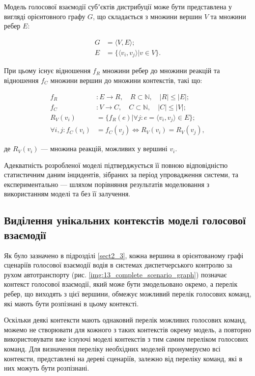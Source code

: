 Модель голосової взаємодії субʼєктів дистрибуції може бути представлена у вигляді орієнтовного графу $G$, що складається з множини вершин $V$ та множини ребер $E$:

\begin{align}
	G&=\langle V,E\rangle; \nonumber\\
	E&=\{\langle v_i,v_j\rangle | v \in V\}. \nonumber
\end{align}

При цьому існує відношення $f_R$ множини ребер до множини реакцій та відношення $f_C$ множини вершин до множини контекстів, такі що:

\begin{align}
	f_R&: E \rightarrow R,\quad R\subset\mathbb{N},\quad |R|\le|E|; \nonumber\\
	f_C&: V \rightarrow C,\quad C\subset\mathbb{N},\quad|C|\le|V|; \nonumber\\
	R_V(v_i) &= \{f_R(e)|\forall j:e=\langle v_i,v_j\rangle \in E\}; \nonumber\\
	\forall i,j: f_C(v_i)&=f_C(v_j) \iff R_V(v_i) = R_V(v_j), \nonumber
\end{align}

\noindent
де $R_V(v_i)$ --- множина реакцій, можливих у вершині $v_i$.

Адекватність розробленої моделі підтверджується її повною відповідністю статистичним даним інцидентів, зібраних за період упровадження системи, та експериментально --- шляхом порівняння результатів моделювання з використанням моделі та без її залучення.

\subsection{Виділення унікальних контекстів моделі голосової взаємодії}

Як було зазначено в підрозділі \ref{sect2_3}, кожна вершина в орієнтованому графі сценаріїв голосової взаємодії водія в системах диспетчерського контролю за рухом автотранспорту (рис. \ref{img:13_complete_scenario_graph}) позначає контекст голосової взаємодії, який може бути змодельовано окремо, а перелік ребер, що виходять з цієї вершини, обмежує можливий перелік голосових команд, які мають  бути розпізнані в цьому контексті.

Оскільки деякі контексти мають однаковий перелік можливих голосових команд, можемо не створювати для кожного з таких контекстів окрему модель, а повторно використовувати вже існуючі моделі контекстів з тим самим переліком голосових команд. Для визначення переліку необхідних моделей пронумеруємо всі контексти, представлені на дереві сценаріїв, залежно від переліку команд, які в них можуть бути розпізнані.

